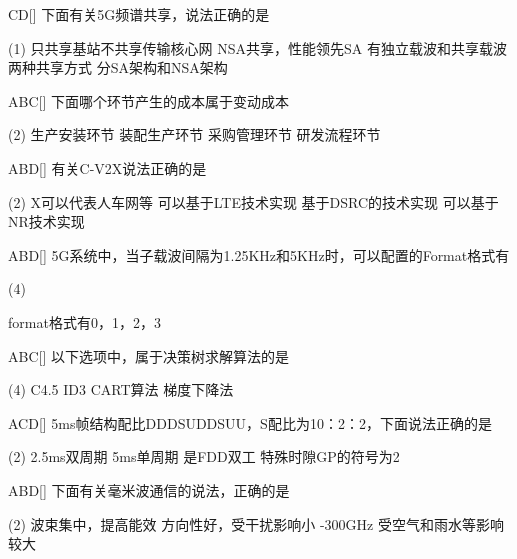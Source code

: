 \begin{choice}{\;CD\;}[]
	下面有关5G频谱共享，说法正确的是
	\begin{tasks}(1)
		\task 只共享基站不共享传输核心网
		\task NSA共享，性能领先SA
		\task 有独立载波和共享载波两种共享方式
		\task 分SA架构和NSA架构
	\end{tasks}
\end{choice}

\begin{choice}{\;ABC\;}[]
	下面哪个环节产生的成本属于变动成本
	\begin{tasks}(2)
		\task 生产安装环节
		\task 装配生产环节
		\task 采购管理环节
		\task 研发流程环节
	\end{tasks}
\end{choice}

\begin{choice}{\;ABD\;}[]
	有关C-V2X说法正确的是
	\begin{tasks}(2)
		\task X可以代表人车网等
		\task 可以基于LTE技术实现
		\task  基于DSRC的技术实现
		\task 可以基于NR技术实现
	\end{tasks}
\end{choice}

\begin{choice}{\;ABD\;}[]
	5G系统中，当子载波间隔为1.25KHz和5KHz时，可以配置的Format格式有
	\begin{tasks}(4)
	\end{tasks}
\end{choice}
\begin{solution}
format格式有{0，1，2，3}
\end{solution}
\begin{choice}{\;ABC\;}[]
	以下选项中，属于决策树求解算法的是
	\begin{tasks}(4)
		\task  C4.5
		\task ID3
		\task CART算法
		\task 梯度下降法
	\end{tasks}
\end{choice}

\begin{choice}{\;ACD\;}[]
	5ms帧结构配比DDDSUDDSUU，S配比为10：2：2，下面说法正确的是
	\begin{tasks}(2)
		\task 2.5ms双周期
		\task 5ms单周期
		\task 是FDD双工
		\task 特殊时隙GP的符号为2
	\end{tasks}
\end{choice}

\begin{choice}{\;ABD\;}[]
	下面有关毫米波通信的说法，正确的是
	\begin{tasks}(2)
		\task 波束集中，提高能效
		\task 方向性好，受干扰影响小
		-300GHz
		\task 受空气和雨水等影响较大
	\end{tasks}
\end{choice}

